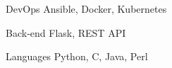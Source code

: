 

\begin{cvskills}

  \cvskill
    {DevOps} %
    {Ansible, Docker, Kubernetes} %

  \cvskill
    {Back-end} %
    {Flask, REST API} %

  \cvskill
    {Languages} %
    {Python, C, Java, Perl} %

\end{cvskills}
